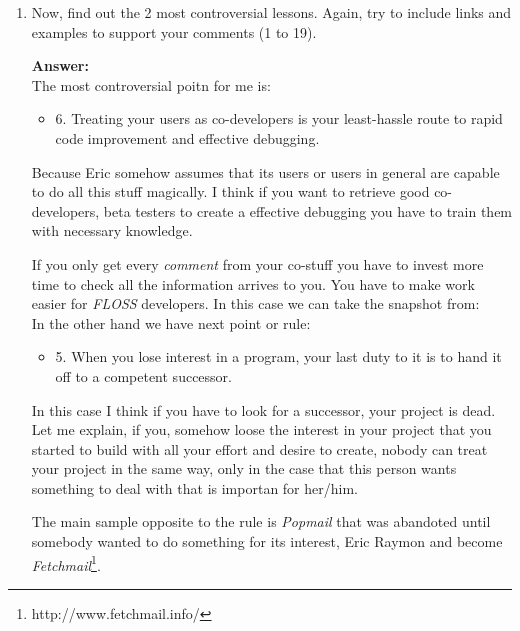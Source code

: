 \documentclass[11pt]{scrartcl}
\begin{document}
\begin{enumerate}
			\indent A sample of spread code could be \emph{Android SDK}\footnote{http://source.android.com/source/downloading.html}. I know, Google only release source code when he wants, but this is not the question, is how code release help your development increases capabilities, gets strong and it's used for more and more people and therefore your beta-tester 'database' increases everyday.\\
			
		\item Now, find out the 2 most controversial lessons. Again, try to include links and examples to support your comments (1 to 19).

			\textbf{Answer:}\\
			
			The most controversial poitn for me is:
			
			\begin{itemize}
			
				\item 6. Treating your users as co-developers is your least-hassle route to rapid code improvement and effective debugging.
			\end{itemize}
			
			Because Eric somehow assumes that its users or users in general are capable to do all this stuff magically. I think if you want to retrieve good co-developers, beta testers to create a effective debugging you have to train them with necessary knowledge. 
			
			If you only get every \emph{comment} from your co-stuff you have to invest more time to check all the information arrives to you. You have to make work easier for \emph{FLOSS} developers. In this case we can take the snapshot from: \\
			
			In the other hand we have next point or rule:
			
			\begin{itemize}
			
				\item 5. When you lose interest in a program, your last duty to it is to hand it off to a competent successor.
			\end{itemize}
			
			In this case I think if you have to look for a successor, your project is dead. Let me explain, if you, somehow loose the interest in your project that you started to build with all your effort and desire to create, nobody can treat your project in the same way, only in the case that this person wants something to deal with that is importan for her/him.
			
			The main sample opposite to the rule is \emph{Popmail} that was abandoted until somebody wanted to do something for its interest, Eric Raymon and become \emph{Fetchmail}\footnote{http://www.fetchmail.info/}.
			
	\end{enumerate}
\end{document}
